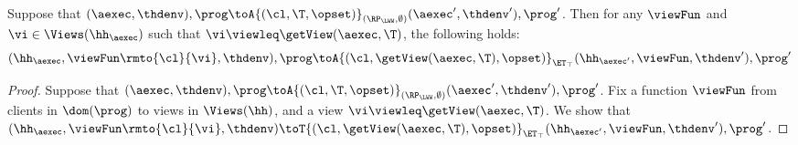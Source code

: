 \begin{proposition}
\label{prop:aexec2kv_transition}
Suppose that $(\aexec, \thdenv), \prog \toA{(\cl, \T, \opset)}_{(\RP_{\LWW}, \emptyset)} (\aexec', \thdenv'), \prog'$. 
Then for any $\viewFun$ and $\vi \in \Views(\hh_{\aexec})$ such that $\vi \viewleq \getView(\aexec, \T)$, 
the following holds:
\[
    (\hh_{\aexec}, \viewFun\rmto{\cl}{\vi}, \thdenv), \prog 
    \toA{(\cl, \getView(\aexec, \T), \opset)}_{\ET_{\top}} (\hh_{\aexec'}, \viewFun, \thdenv'), \prog'
\]
\end{proposition}
\begin{proof}
Suppose that $(\aexec, \thdenv), \prog \toA{(\cl, \T, \opset)}_{(\RP_{\LWW}, \emptyset)} (\aexec', \thdenv'), \prog'$. 
Fix a function $\viewFun$ from clients in $\dom(\prog)$ to views in $\Views(\hh)$, and a view $\vi \viewleq \getView(\aexec, \T)$.
We show that 
$(\hh_{\aexec}, \viewFun\rmto{\cl}{\vi}, \thdenv) \toT{(\cl, \getView(\aexec, \T), \opset)}_{\ET_{\top}} (\hh_{\aexec'}, 
\viewFun, \thdenv'), \prog'$. 


\end{proof}
